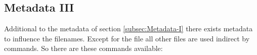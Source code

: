 
\newpage
\subsection{Metadata III}\label{subsec:Metadata-III}

Additional to the metadata of section \ref{subsec:Metadata-I} there exists
metadata to influence the filenames. Except for the
 file all other files are used indirect
by commands. So there are these commands available:

